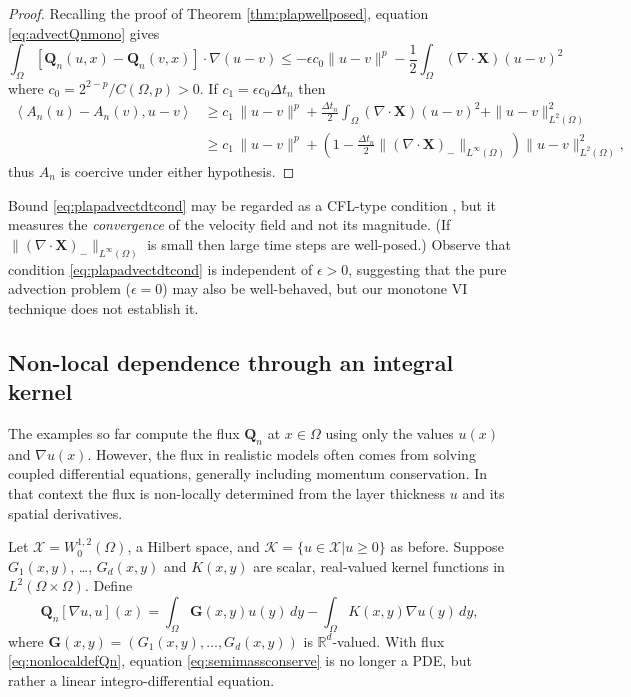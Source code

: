 \documentclass[final,onefignum]{siamart190516}
\newcommand\bG{\mathbf{G}}
\newcommand\bQ{\mathbf{Q}}
\newcommand\bX{\mathbf{X}}
\newcommand{\Div}{\nabla\cdot}
\newcommand\eps{\epsilon}
\newcommand{\grad}{\nabla}
\newcommand{\ip}[2]{\ensuremath{\left<#1,#2\right>}}
\newcommand\RR{\mathbb{R}}
\begin{document}
\begin{proof} Recalling the proof of Theorem \ref{thm:plapwellposed}, equation \eqref{eq:advectQnmono} gives
\begin{equation*}
\int_\Omega \left[\bQ_n(u,x) - \bQ_n(v,x)\right] \cdot \grad (u - v) \le - \eps c_0 \|u-v\|^p - \frac{1}{2} \int_\Omega (\Div\bX) (u-v)^2
\end{equation*}
where $c_0=2^{2-p}/C(\Omega,p)>0$.  If $c_1 = \eps c_0 \Delta t_n$ then
\begin{align*}
\ip{A_n(u) - A_n(v)}{u-v} &\ge c_1\, \|u-v\|^p + \frac{\Delta t_n}{2} \int_\Omega (\Div\bX) (u-v)^2 + \|u-v\|_{L^2(\Omega)}^2 \\
   &\ge c_1\, \|u-v\|^p + \left(1 - \frac{\Delta t_n}{2} \|(\Div \bX)_-\|_{L^\infty(\Omega)}\right) \|u-v\|_{L^2(\Omega)}^2,
\end{align*}
thus $A_n$ is coercive under either hypothesis. \end{proof}

Bound \eqref{eq:plapadvectdtcond} may be regarded as a CFL-type condition \cite{LeVeque2002}, but it measures the \emph{convergence} of the velocity field and not its magnitude.  (If $\|(\Div \bX)_-\|_{L^\infty(\Omega)}$ is small then large time steps are well-posed.) Observe that condition \eqref{eq:plapadvectdtcond} is independent of $\eps>0$, suggesting that the pure advection problem ($\eps = 0$) may also be well-behaved, but our monotone VI technique does not establish it.

\subsection{Non-local dependence through an integral kernel} \label{subsec:nonlocal}   The examples so far compute the flux $\bQ_n$ at $x\in\Omega$ using only the values $u(x)$ and $\grad u(x)$.  However, the flux in realistic models often comes from solving coupled differential equations, generally including momentum conservation.  In that context the flux is non-locally determined from the layer thickness $u$ and its spatial derivatives.

Let $\mathcal{X} = W_0^{1,2}(\Omega)$, a Hilbert space, and $\mathcal{K}=\{u\in\mathcal{X}|u\ge 0\}$ as before.  Suppose $G_1(x,y)$, \dots, $G_d(x,y)$ and $K(x,y)$ are scalar, real-valued kernel functions in $L^2(\Omega\times \Omega)$.  Define
\begin{equation}
\bQ_n[\grad u,u](x) = \int_\Omega \bG(x,y) u(y)\,dy - \int_\Omega K(x,y) \grad u(y)\,dy, \label{eq:nonlocaldefQn}
\end{equation}
where $\bG(x,y) = (G_1(x,y), \dots, G_d(x,y))$ is $\RR^d$-valued.  With flux \eqref{eq:nonlocaldefQn}, equation \eqref{eq:semimassconserve} is no longer a PDE, but rather a linear integro-differential equation.
\end{document}
